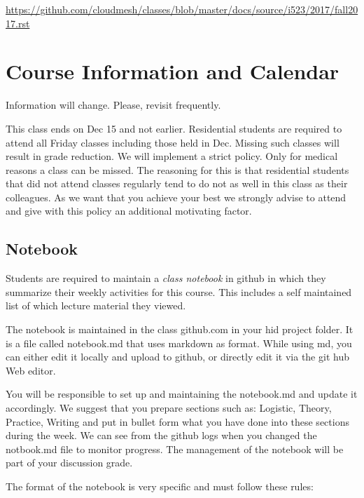 \begin{fileremark}\url{https://github.com/cloudmesh/classes/blob/master/docs/source/i523/2017/fall2017.rst}\end{fileremark}
\section{Course Information and
Calendar}\label{course-information-and-calendar}

Information will change. Please, revisit frequently.

This class ends on Dec 15 and not earlier. Residential students are
required to attend all Friday classes including those held in Dec.
Missing such classes will result in grade reduction. We will implement a
strict policy. Only for medical reasons a class can be missed. The
reasoning for this is that residential students that did not attend
classes regularly tend to do not as well in this class as their
colleagues. As we want that you achieve your best we strongly advise to
attend and give with this policy an additional motivating factor.

\subsection{Notebook}\label{notebook}

Students are required to maintain a \emph{class notebook} in github in
which they summarize their weekly activities for this course. This
includes a self maintained list of which lecture material they viewed.

The notebook is maintained in the class github.com in your hid project
folder. It is a file called notebook.md that uses markdown as format.
While using md, you can either edit it locally and upload to github, or
directly edit it via the git hub Web editor.

You will be responsible to set up and maintaining the notebook.md and
update it accordingly. We suggest that you prepare sections such as:
Logistic, Theory, Practice, Writing and put in bullet form what you have
done into these sections during the week. We can see from the github
logs when you changed the notbook.md file to monitor progress. The
management of the notebook will be part of your discussion grade.

The format of the notebook is very specific and must follow these rules:

